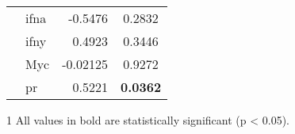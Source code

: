 \begin{table}[htpb]
\begin{threeparttable}
\begin{tabular}{llrc}
                                                                           & \gls{ifna} & -0.5476   & 0.2832 \\
                                                                           & \gls{ifny} & 0.4923    & 0.3446 \\
                                                                           & Myc        & -0.02125  & 0.9272 \\
                                                                           & \gls{pr}   & 0.5221    & \bfseries 0.0362  \\
				\hline
				\hline
			\end{tabular}
			\begin{tablenotes}
				\begin{footnotesize}
				\item [1] All values in bold are statistically significant (p \textless{} 0.05).
				\end{footnotesize}
			\end{tablenotes}
		\end{threeparttable}
	\end{table}

